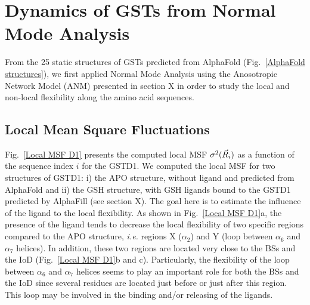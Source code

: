 \section{Dynamics of GSTs from Normal Mode Analysis}

From the 25 static structures of GSTs predicted from AlphaFold (Fig.~\ref{AlphaFold structures}), we first applied Normal Mode Analysis using the Anosotropic Network Model (ANM) presented in section X in order to study the local and non-local flexibility along the amino acid sequences.

\subsection{Local Mean Square Fluctuations}

Fig.~\ref{Local MSF D1} presents the computed local MSF $\sigma^2(\vec{R}_i)$ as a function of the sequence index $i$ for the GSTD1. We computed the local MSF for two structures of GSTD1: i) the APO structure, without ligand and predicted from AlphaFold and ii) the GSH structure, with GSH ligands bound to the GSTD1 predicted by AlphaFill (see section X). The goal here is to estimate the influence of the ligand to the local flexibility. As shown in Fig.~\ref{Local MSF D1}a, the presence of the ligand tends to decrease the local flexibility of two specific regions compared to the APO structure, \textit{i.e.} regions X ($\alpha_2$) and Y (loop between $\alpha_6$ and $\alpha_7$ helices).
In addition, these two regions are located very close to the BSs and the IoD (Fig.~\ref{Local MSF D1}b and c). Particularly, the flexibility of the loop between $\alpha_6$ and $\alpha_7$ helices seems to play an important role for both the BSs and the IoD since several residues are located just before or just after this region. This loop may be involved in the binding and/or releasing of the ligands.

